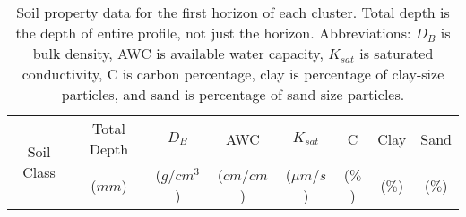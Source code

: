 \begin{table}[h!]
	\caption[Soil property data for the first horizon of each cluster.]{Soil property data for the first horizon of each cluster. Total depth is the depth of entire profile, not just the horizon. Abbreviations: $D_B$ is bulk density, AWC is available water capacity, $K_{sat}$ is saturated conductivity, C is carbon percentage, clay is percentage of clay-size particles, and sand is percentage of sand size particles.}
	\centering
		\begin{tabular}{c c c c c c c c}
			\hline
			\multirow{2}{*}{Soil Class}	 & 	Total Depth	 & 	$D_B$	 & 	AWC	 & 	$K_{sat}$	 & 	C	 & 	Clay	 & 	Sand \\
										& 	($mm$)	 	& ($g/cm^3$)& ($cm/cm$)& 	($\mu m/s$)	 & 	($\%$)	 & 	($\%$)	 & 	($\%$) \\[0.5ex]
			 

\end{tabular}
\end{table}
